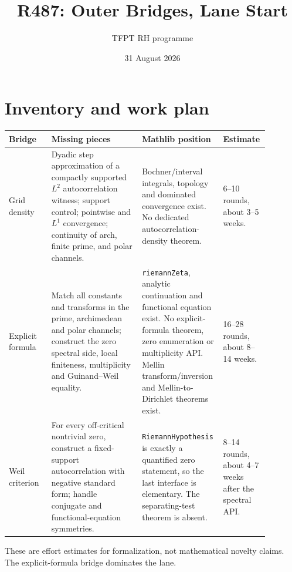 \documentclass[11pt]{article}
\title{R487: Outer Bridges, Lane Start}
\author{TFPT RH programme}
\date{31 August 2026}
\newcommand{\code}[1]{\nolinkurl{#1}}
\begin{document}
\maketitle

\begin{center}
\end{center}

\section{Inventory and work plan}

\begin{center}
\small
\begin{tabular}{p{0.16\linewidth}p{0.34\linewidth}p{0.25\linewidth}p{0.13\linewidth}}
\hline
Bridge & Missing pieces & Mathlib position & Estimate\\ \hline
Grid density &
Dyadic step approximation of a compactly supported \(L^2\)
autocorrelation witness; support control; pointwise and \(L^1\)
convergence; continuity of arch, finite prime, and polar channels. &
Bochner/interval integrals, topology and dominated convergence exist.
No dedicated autocorrelation-density theorem. &
6--10 rounds, about 3--5 weeks.\\
Explicit formula &
Match all constants and transforms in the prime, archimedean and polar
channels; construct the zero spectral side, local finiteness,
multiplicity and Guinand--Weil equality. &
\code{riemannZeta}, analytic continuation and functional equation exist.
No explicit-formula theorem, zero enumeration or multiplicity API.
Mellin transform/inversion and Mellin-to-Dirichlet theorems exist. &
16--28 rounds, about 8--14 weeks.\\
Weil criterion &
For every off-critical nontrivial zero, construct a fixed-support
autocorrelation with negative standard form; handle conjugate and
functional-equation symmetries. &
\code{RiemannHypothesis} is exactly a quantified zero statement, so the
last interface is elementary.  The separating-test theorem is absent. &
8--14 rounds, about 4--7 weeks after the spectral API.\\ \hline
\end{tabular}
\end{center}

These are effort estimates for formalization, not mathematical
novelty claims.  The explicit-formula bridge dominates the lane.
\end{document}

